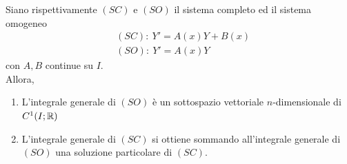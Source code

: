 \begin{theorem} \label{Teo: Struttura dell'integrale generale per i sistemi}
    Siano rispettivamente $(SC)$ e $(SO)$ il sistema completo ed il sistema omogeneo
    \begin{align}
        &(SC):\ Y'=A(x)Y+ B(x)\\
        &(SO):\ Y'=A(x)Y
    \end{align}
    con $A, B$ continue su $I$.\\
    Allora,
    \begin{enumerate}
        \item L'integrale generale di $(SO)$ è un sottospazio vettoriale $n$-dimensionale di $C^1(I; \mathbb{R})$
        \item L'integrale generale di $(SC)$ si ottiene sommando all'integrale generale di $(SO)$ una soluzione particolare di $(SC)$.
    \end{enumerate}
\end{theorem}
